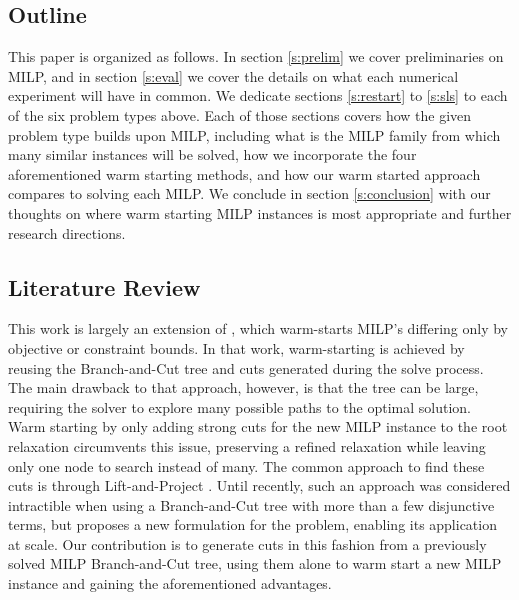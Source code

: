 \documentclass[10pt]{article}
\begin{document}
	\subsection{Outline} \label{ss:outline}
	This paper is organized as follows. In section \ref{s:prelim} we cover preliminaries on MILP, and in section \ref{s:eval} we cover the details on what each numerical experiment will have in common. We dedicate sections \ref{s:restart} to \ref{s:sls} to each of the six problem types above. Each of those sections covers how the given problem type builds upon MILP, including what is the MILP family from which many similar instances will be solved, how we incorporate the four aforementioned warm starting methods, and how our warm started approach compares to solving each MILP. We conclude in section \ref{s:conclusion} with our thoughts on where warm starting MILP instances is most appropriate and further research directions.
	
	\subsection{Literature Review} \label{ss:review}	
	This work is largely an extension of \cite{ws}, which warm-starts MILP's differing only by objective or constraint bounds. In that work, warm-starting is achieved by reusing the Branch-and-Cut tree and cuts generated during the solve process. The main drawback to that approach, however, is that the tree can be large, requiring the solver to explore many possible paths to the optimal solution. Warm starting by only adding strong cuts for the new MILP instance to the root relaxation circumvents this issue, preserving a refined relaxation while leaving only one node to search instead of many. The common approach to find these cuts is through Lift-and-Project \cite{liftproject}. Until recently, such an approach was considered intractible when using a Branch-and-Cut tree with more than a few disjunctive terms, but \cite{aleks} proposes a new formulation for the problem, enabling its application at scale. Our contribution is to generate cuts in this fashion from a previously solved MILP Branch-and-Cut tree, using them alone to warm start a new MILP instance and gaining the aforementioned advantages.
	
\end{document}
